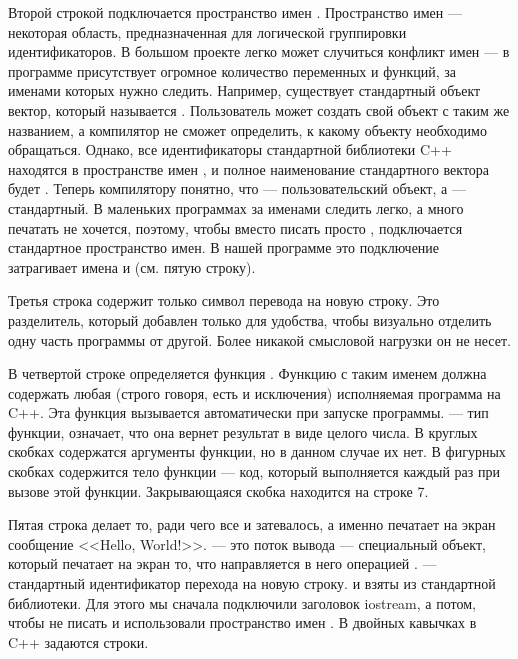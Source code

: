 \documentclass[book.tex]{subfiles}
\begin{document}
Второй строкой подключается пространство имен . Пространство имен --- некоторая область, предназначенная для логической группировки идентификаторов. В большом проекте легко может случиться конфликт имен --- в программе присутствует огромное количество переменных и функций, за именами которых нужно следить. Например, существует стандартный объект вектор, который называется . Пользователь может создать свой объект с таким же названием, а компилятор не сможет определить, к какому объекту необходимо обращаться. Однако, все идентификаторы стандартной библиотеки C++ находятся в пространстве имен , и полное наименование стандартного вектора будет . Теперь компилятору понятно, что  --- пользовательский объект, а  --- стандартный. В маленьких программах за именами следить легко, а много печатать не хочется, поэтому, чтобы вместо  писать просто , подключается стандартное пространство имен. В нашей программе это подключение затрагивает имена  и  (см. пятую строку).

Третья строка содержит только символ перевода на новую строку. Это разделитель, который добавлен только для удобства, чтобы визуально отделить одну часть программы от другой. Более никакой смысловой нагрузки он не несет.

В четвертой строке определяется функция . Функцию с таким именем должна содержать любая (строго говоря, есть и исключения) исполняемая программа на C++. Эта функция вызывается автоматически при запуске программы.  --- тип функции, означает, что она вернет результат в виде целого числа. В круглых скобках содержатся аргументы функции, но в данном случае их нет. В фигурных скобках содержится тело функции --- код, который выполняется каждый раз при вызове этой функции. Закрывающаяся скобка находится на строке 7.

Пятая строка делает то, ради чего все и затевалось, а именно печатает на экран сообщение <<Hello, World!>>.  --- это поток вывода --- специальный объект, который печатает на экран то, что направляется в него операцией \cppword{<{}<}.  --- стандартный идентификатор перехода на новую строку.  и  взяты из стандартной библиотеки. Для этого мы сначала подключили заголовок iostream, а потом, чтобы не писать  и  использовали пространство имен . В двойных кавычках в C++ задаются строки.
\end{document}
